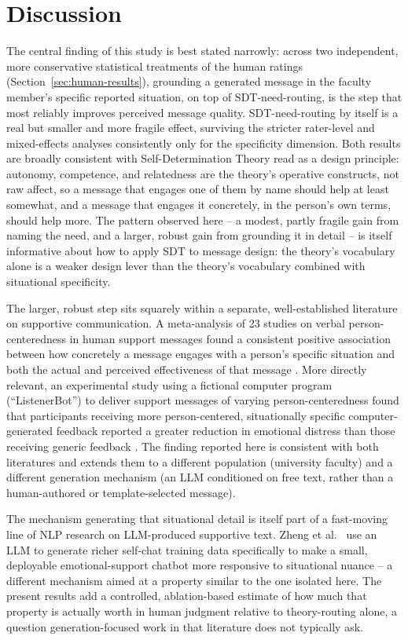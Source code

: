 \documentclass[higheredu,article,submit,pdftex,moreauthors]{Definitions/mdpi}
\begin{document}
\section{Discussion}

The central finding of this study is best stated narrowly: across two independent, more conservative statistical treatments of the human ratings (Section~\ref{sec:human-results}), grounding a generated message in the faculty member's specific reported situation, on top of SDT-need-routing, is the step that most reliably improves perceived message quality. SDT-need-routing by itself is a real but smaller and more fragile effect, surviving the stricter rater-level and mixed-effects analyses consistently only for the specificity dimension. Both results are broadly consistent with Self-Determination Theory \cite{deciryan2000} read as a design principle: autonomy, competence, and relatedness are the theory's operative constructs, not raw affect, so a message that engages one of them by name should help at least somewhat, and a message that engages it concretely, in the person's own terms, should help more. The pattern observed here -- a modest, partly fragile gain from naming the need, and a larger, robust gain from grounding it in detail -- is itself informative about how to apply SDT to message design: the theory's vocabulary alone is a weaker design lever than the theory's vocabulary combined with situational specificity.

The larger, robust step sits squarely within a separate, well-established literature on supportive communication. A meta-analysis of 23 studies on verbal person-centeredness in human support messages found a consistent positive association between how concretely a message engages with a person's specific situation and both the actual and perceived effectiveness of that message \cite{highdillard2012}. More directly relevant, an experimental study using a fictional computer program (``ListenerBot'') to deliver support messages of varying person-centeredness found that participants receiving more person-centered, situationally specific computer-generated feedback reported a greater reduction in emotional distress than those receiving generic feedback \cite{rains2020}. The finding reported here is consistent with both literatures and extends them to a different population (university faculty) and a different generation mechanism (an LLM conditioned on free text, rather than a human-authored or template-selected message).

The mechanism generating that situational detail is itself part of a fast-moving line of NLP research on LLM-produced supportive text. Zheng et al.\ \cite{zheng2024} use an LLM to generate richer self-chat training data specifically to make a small, deployable emotional-support chatbot more responsive to situational nuance -- a different mechanism aimed at a property similar to the one isolated here. The present results add a controlled, ablation-based estimate of how much that property is actually worth in human judgment relative to theory-routing alone, a question generation-focused work in that literature does not typically ask.
\end{document}

